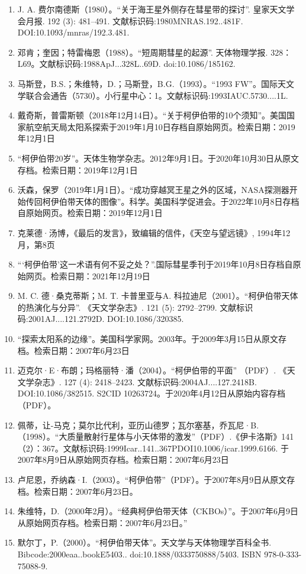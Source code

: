 \begin{enumerate}
\item J. A. 费尔南德斯（1980）。“关于海王星外侧存在彗星带的探讨”. 皇家天文学会月报. 192 (3): 481–491. 文献标识码:1980MNRAS.192..481F. DOI:10.1093/mnras/192.3.481.
\item 邓肯；奎因；特雷梅恩（1988）。“短周期彗星的起源”. 天体物理学报. 328：L69。文献标识码:1988ApJ...328L..69D. doi:10.1086/185162.
\item 马斯登，B.S.；朱维特，D.；马斯登，B.G.（1993）。“1993 FW”。国际天文学联合会通告（5730）。小行星中心：1。文献标识码:1993IAUC.5730....1L.
\item 戴奇斯，普雷斯顿（2018年12月14日）。“关于柯伊伯带的10个须知”。美国国家航空航天局太阳系探索于2019年1月10日存档自原始网页。检索日期：2019年12月1日
\item “柯伊伯带20岁”。天体生物学杂志。2012年9月1日。于2020年10月30日从原文存档。检索日期：2019年12月1日
\item 沃森，保罗（2019年1月1日）。“成功穿越冥王星之外的区域，NASA探测器开始传回柯伊伯带天体的图像”。科学。美国科学促进会。于2022年10月8日存档自原始网页。检索日期：2019年12月1日
\item 克莱德·汤博，《最后的发言》，致编辑的信件，《天空与望远镜》, 1994年12月，第8页
\item “‘柯伊伯带’这一术语有何不妥之处？”.国际彗星季刊于2019年10月8日存档自原始网页。检索日期：2021年12月19日
\item M. C. 德·桑克蒂斯；M. T. 卡普里亚与A. 科拉迪尼（2001）。“柯伊伯带天体的热演化与分异”. 《天文学杂志》. 121 (5): 2792–2799. 文献标识码:2001AJ....121.2792D. DOI:10.1086/320385.
\item “探索太阳系的边缘”。美国科学家网。2003年。于2009年3月15日从原文存档。检索日期：2007年6月23日
\item 迈克尔·E·布朗；玛格丽特·潘（2004）。“柯伊伯带的平面” （PDF）. 《天文学杂志》. 127 (4): 2418–2423. 文献标识码:2004AJ....127.2418B. DOI:10.1086/382515. S2CID 10263724。于2020年4月12日从原始内容存档 （PDF）。
\item 佩蒂，让-马克；莫尔比代利，亚历山德罗；瓦尔塞基，乔瓦尼·B.（1998）。“大质量散射行星体与小天体带的激发”（PDF）.《伊卡洛斯》141（2）：367。文献标识码:1999Icar..141..367PDOI10.1006/icar.1999.6166. 于2007年8月9日从原始网页存档。检索日期：2007年6月23日
\item 卢尼恩，乔纳森·I.（2003）。“柯伊伯带”（PDF）。于2007年8月9日从原文存档。检索日期：2007年6月23日。
\item 朱维特，D.（2000年2月）。“经典柯伊伯带天体（CKBOs）”。于2007年6月9日从原始网页存档。检索日期：2007年6月23日。”
\item 默尔丁，P.（2000）。“柯伊伯带天体”。天文学与天体物理学百科全书. Bibcode:2000eaa..bookE5403.. doi:10.1888/0333750888/5403. ISBN 978-0-333-75088-9.

\end{enumerate}
